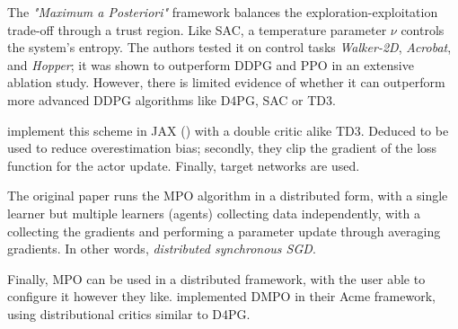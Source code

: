 The \textit{"Maximum a Posteriori"} framework balances the exploration-exploitation trade-off through a trust region. Like SAC, a temperature parameter \(\nu\) controls the system's entropy. The authors tested it on control tasks \textit{Walker-2D}, \textit{Acrobat}, and \textit{Hopper}; it was shown to outperform DDPG and PPO in an extensive ablation study. However, there is limited evidence of whether it can outperform more advanced DDPG algorithms like D4PG, SAC or TD3.

\cite{prior2024jaxrl} implement this scheme in JAX (\cite{jax2018github}) with a double critic alike TD3. Deduced to be used to reduce overestimation bias; secondly, they clip the gradient of the loss function for the actor update. Finally, target networks are used.

The original paper runs the MPO algorithm in a distributed form, with a single learner but multiple learners (agents) collecting data independently, with a  collecting the gradients and performing a parameter update through averaging gradients. In other words, \textit{distributed synchronous SGD}.


Finally, MPO can be used in a distributed framework, with the user able to configure it however they like. \cite{hoffman2020acme} implemented DMPO in their Acme framework, using distributional critics similar to D4PG.